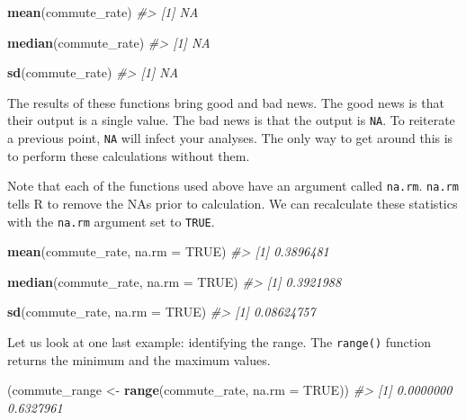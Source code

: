 \documentclass[
]{book}
\newenvironment{Shaded}{\begin{snugshade}}{\end{snugshade}}
\newcommand{\CommentTok}[1]{\textcolor[rgb]{0.56,0.35,0.01}{\textit{#1}}}
\newcommand{\DataTypeTok}[1]{\textcolor[rgb]{0.13,0.29,0.53}{#1}}
\newcommand{\KeywordTok}[1]{\textcolor[rgb]{0.13,0.29,0.53}{\textbf{#1}}}
\newcommand{\NormalTok}[1]{#1}
\newcommand{\OtherTok}[1]{\textcolor[rgb]{0.56,0.35,0.01}{#1}}
\newcommand{\StringTok}[1]{\textcolor[rgb]{0.31,0.60,0.02}{#1}}
\begin{document}
\begin{Shaded}
\begin{Highlighting}[]
\KeywordTok{mean}\NormalTok{(commute\_rate)}
\CommentTok{\#\textgreater{} [1] NA}

\KeywordTok{median}\NormalTok{(commute\_rate)}
\CommentTok{\#\textgreater{} [1] NA}

\KeywordTok{sd}\NormalTok{(commute\_rate)}
\CommentTok{\#\textgreater{} [1] NA}
\end{Highlighting}
\end{Shaded}

The results of these functions bring good and bad news. The good news is that their output is a single value. The bad news is that the output is \texttt{NA}. To reiterate a previous point, \texttt{NA} will infect your analyses. The only way to get around this is to perform these calculations without them.

Note that each of the functions used above have an argument called \texttt{na.rm}. \texttt{na.rm} tells R to remove the NAs prior to calculation. We can recalculate these statistics with the \texttt{na.rm} argument set to \texttt{TRUE}.

\begin{Shaded}
\begin{Highlighting}[]
\KeywordTok{mean}\NormalTok{(commute\_rate, }\DataTypeTok{na.rm =} \OtherTok{TRUE}\NormalTok{)}
\CommentTok{\#\textgreater{} [1] 0.3896481}

\KeywordTok{median}\NormalTok{(commute\_rate, }\DataTypeTok{na.rm =} \OtherTok{TRUE}\NormalTok{)}
\CommentTok{\#\textgreater{} [1] 0.3921988}

\KeywordTok{sd}\NormalTok{(commute\_rate, }\DataTypeTok{na.rm =} \OtherTok{TRUE}\NormalTok{)}
\CommentTok{\#\textgreater{} [1] 0.08624757}
\end{Highlighting}
\end{Shaded}

Let us look at one last example: identifying the range. The \texttt{range()} function returns the minimum and the maximum values.

\begin{Shaded}
\begin{Highlighting}[]
\NormalTok{(commute\_range \textless{}{-}}\StringTok{ }\KeywordTok{range}\NormalTok{(commute\_rate, }\DataTypeTok{na.rm =} \OtherTok{TRUE}\NormalTok{))}
\CommentTok{\#\textgreater{} [1] 0.0000000 0.6327961}
\end{Highlighting}
\end{Shaded}
\end{document}
